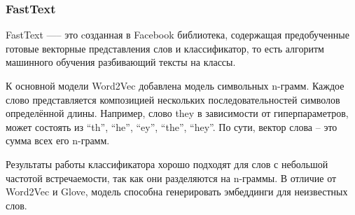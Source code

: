 \subsubsection{FastText}
FastText —-- это cозданная в Facebook библиотека, содержащая предобученные готовые векторные представления слов и классификатор, то есть алгоритм машинного обучения разбивающий тексты на классы.

К основной модели Word2Vec добавлена модель символьных n-грамм. Каждое слово представляется композицией нескольких последовательностей символов определённой длины. Например, слово they в зависимости от гиперпараметров, может состоять из “th”, “he”, “ey”, “the”, “hey”. По сути, вектор слова – это сумма всех его n-грамм.

Результаты работы классификатора хорошо подходят для слов с небольшой частотой встречаемости, так как они разделяются на n-граммы. В отличие от Word2Vec и Glove, модель способна генерировать эмбеддинги для неизвестных слов.